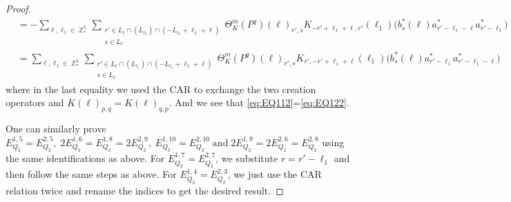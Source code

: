 \documentclass[sn-mathphys, Numbered ,a4paper]{sn-jnl}%
\DeclareMathOperator{\Z}{\mathbb{Z}}
\theoremstyle{plain}
\theoremstyle{definition}
\theoremstyle{remark}
\theoremstyle{plain}
\theoremstyle{definition}
\theoremstyle{remark}
\begin{document}
\begin{proof}
\begin{align}
		&=-\sum\limits_{\ell, \ell_1\in \Z^3_*}\sum\limits_{\substack{r' \in  L_{\ell} \cap (L_{\ell_1}) \cap (-L_{\ell_1}+\ell_1+\ell)\\ s \in L_{\ell}}} \Theta^m_K(P^q)(\ell)_{r',s} K_{-r'+\ell_1+\ell,r'}(\ell_1)\Big( b^*_{s}(\ell) a^*_{r'-\ell_1-\ell}a^*_{r'-\ell_1}\Big)\nonumber\\
		&=\sum\limits_{\ell, \ell_1\in \Z^3_*}\sum\limits_{\substack{r' \in  L_{\ell} \cap (L_{\ell_1}) \cap (-L_{\ell_1}+\ell_1+\ell)\\ s \in L_{\ell}}} \Theta^m_K(P^q)(\ell)_{r',s} K_{r',-r'+\ell_1+\ell}(\ell_1)\Big( b^*_{s}(\ell) a^*_{r'-\ell_1} a^*_{r'-\ell_1-\ell}\Big)\label{eq:EQ122} 
	\end{align}
	where in the last equality we used the CAR to exchange the two creation operators and $K(\ell)_{p,q}=K(\ell)_{q,p}$. And we see that \eqref{eq:EQ112}=\eqref{eq:EQ122}.
	
	One can similarly prove $E_{Q_2}^{1,5}\!=\! E_{Q_2}^{2,5},\; 2E_{Q_2}^{1,6}\! =\! E_{Q_2}^{1,8}\!=\! 2E_{Q_2}^{2,9},\; E_{Q_2}^{1,10}\!=\!E_{Q_2}^{2,10}\;\mathrm{and}\; 2E_{Q_2}^{1,9}\! =\! 2E_{Q_2}^{2,6}\!=\! E_{Q_2}^{2,8}$ using the same identifications as above. 
	For $ E_{Q_2}^{1,7}\! =\! E_{Q_2}^{2,7}$, we substitute $r=r'-\ell_1$  and then follow the same steps as above. 
	For $E_{Q_2}^{1,4}\! =\! E_{Q_2}^{2,3} $, we just use the CAR relation twice and rename the indices to get the desired result.
\end{proof}
\end{document}
